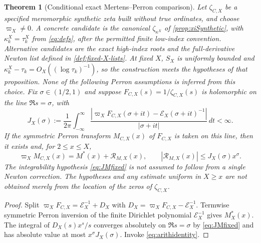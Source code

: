 \documentclass[11pt,reqno]{amsart}
\numberwithin{equation}{section}
\newtheorem{theorem}{Theorem}[section]
\begin{document}
\begin{theorem}[Conditional exact Mertens--Perron comparison]
\label{thm:PerronMfixed}
Let $\zeta_{C,X}$ be a specified meromorphic synthetic zeta
built without true ordinates, and choose $\varpi_X\ne0$.
A concrete candidate is the canonical $\zeta_{\kappa^X}$ of
\cref{prop:xiSynthetic}, with $\kappa_k^X=\tau_k^X$
from \eqref{eq:defs}, after the permitted finite low-index convention.
Alternative candidates are the exact high-index roots and the
full-derivative Newton list defined in \cref{def:fixed-X-lists}.
At fixed $X$, $S_X$ is uniformly bounded and
$\kappa_k^X-\tau_k=O_X((\log\tau_k)^{-1})$,
so the construction meets the hypotheses of that proposition.
None of the following Perron assumptions is inferred from this choice.
Fix $\sigma\in(1/2,1)$ and suppose
$F_{C,X}(s)=1/\zeta_{C,X}(s)$ is holomorphic on the line
$\Re s=\sigma$, with
\begin{equation}\label{eq:JMfixed}
 J_X(\sigma):=\frac1{2\pi}
 \int_{-\infty}^{\infty}
 \frac{|\varpi_X F_{C,X}(\sigma+it)-\mathscr E_X(\sigma+it)^{-1}|}
 {|\sigma+it|}\,dt<\infty.
\end{equation}
If the symmetric Perron transform $M_{C,X}(x)$ of $F_{C,X}$
is taken on this line, then it exists and, for $2\le x\le X$,
\begin{equation}\label{eq:PerronMfixed}
 \boxed{\varpi_X M_{C,X}(x)=M^*(x)+\mathcal R_{M,X}(x),\qquad
 |\mathcal R_{M,X}(x)|\le J_X(\sigma)x^\sigma.}
\end{equation}
The integrability hypothesis \eqref{eq:JMfixed} is not assumed to follow from a single Newton correction. The hypotheses and any estimate uniform in
$X\ge x$ are \emph{not} obtained merely from the location of the
zeros of $\zeta_{C,X}$.
\end{theorem}
\begin{proof}
Split $\varpi_XF_{C,X}=\mathscr E_X^{-1}+D_X$ with
$D_X=\varpi_XF_{C,X}-\mathscr E_X^{-1}$.  Termwise symmetric Perron inversion
of the finite Dirichlet polynomial $\mathscr E_X^{-1}$ gives $M_X^*(x)$.
The integral of $D_X(s)x^s/s$ converges absolutely on
$\Re s=\sigma$ by \eqref{eq:JMfixed} and has absolute value at most
$x^\sigma J_X(\sigma)$.  Invoke \eqref{eq:arithidentity}.
\end{proof}
\end{document}
